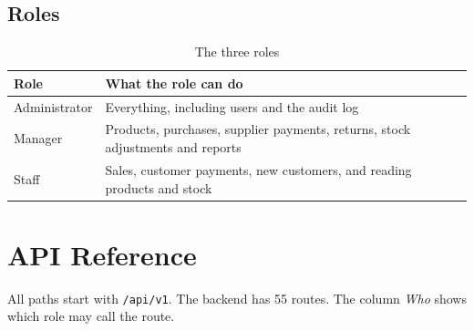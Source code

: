\documentclass[11pt,a4paper]{article}
\newcommand{\code}[1]{\texttt{#1}}
\begin{document}
\subsection{Roles}
\begin{table}[h]
\centering
\begin{tabularx}{\textwidth}{@{}P{3cm}Y@{}}
\toprule
\textbf{Role} & \textbf{What the role can do} \\
\midrule
Administrator & Everything, including users and the audit log \\
Manager & Products, purchases, supplier payments, returns, stock adjustments and reports \\
Staff & Sales, customer payments, new customers, and reading products and stock \\
\bottomrule
\end{tabularx}
\caption{The three roles}
\end{table}

\section{API Reference}
All paths start with \code{/api/v1}. The backend has 55 routes. The column \emph{Who} shows which role may call the route.
\end{document}
